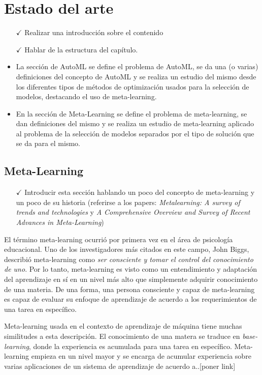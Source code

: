 \chapter{Estado del arte }\label{chapter:review}

 \begin{itemize}
 	\item[$\checkmark$] Realizar una introducción sobre el contenido 
 	\item[$\checkmark$] Hablar de la estructura del capítulo.
 	\item La sección de AutoML se define el problema de AutoML, se da una (o varias) definiciones del concepto de AutoML y se realiza un estudio del mismo desde los diferentes tipos de métodos de optimización usados para la selección de modelos, destacando el uso de meta-learning.
 	\item En la sección de Meta-Learning se define el problema de meta-learning, se dan definiciones del mismo y se realiza un estudio de meta-learning aplicado al problema de la selección de modelos separados por el tipo de solución que se da para el mismo.
 \end{itemize}

\section{Meta-Learning}

\begin{itemize}
	\item[$\checkmark$] Introducir esta sección hablando un poco del concepto de meta-learning y un poco de su historia (referirse a los papers: \textit{Metalearning: A survey of trends and technologies} y \textit{A Comprehensive Overview and Survey of Recent Advances in Meta-Learning})
\end{itemize}

El término meta-learning ocurrió por primera vez en el área de psicología educacional. Uno de los investigadores más citados en este campo, John Biggs, describió meta-learning como \textit{ser consciente y tomar el control del conocimiento de uno}. Por lo tanto, meta-learning es visto como un entendimiento y adaptación del aprendizaje en sí en un nivel más alto que simplemente adquirir conocimiento de una materia. De una forma, una persona consciente y capaz de meta-learning es capaz de evaluar su enfoque de aprendizaje de acuerdo a los requerimientos de una tarea en específico.

Meta-learning usada en el contexto de aprendizaje de máquina tiene muchas similitudes a esta descripción. El conocimiento de una matera se traduce en \textit{base-learning}, donde la experiencia es acumulada para una tarea en específico. Meta-learning empieza en un nivel mayor y se encarga de acumular experiencia sobre varias aplicaciones de un sistema de aprendizaje de acuerdo a..[poner link]


